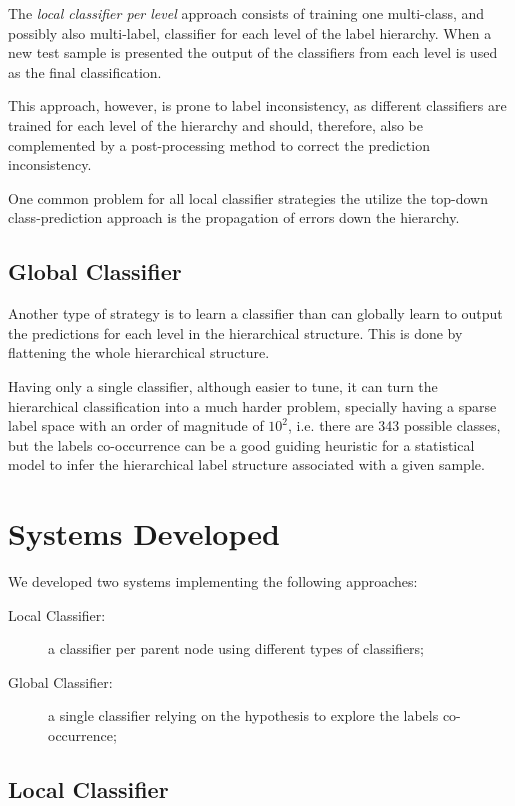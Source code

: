 \documentclass[11pt,a4paper]{article}
\begin{document}
The \textit{local classifier per level} approach consists of training one
multi-class, and possibly also multi-label, classifier for each level of the label
hierarchy. When a new test sample is presented the output of the classifiers
from each level is used as the final classification.

This approach, however, is prone to label inconsistency, as different classifiers
are trained for each level of the hierarchy and should, therefore, also be
complemented by a post-processing method to correct the prediction inconsistency.

One common problem for all local classifier strategies the utilize the top-down
class-prediction approach is the propagation of errors down the hierarchy.



\subsection{Global Classifier}

Another type of strategy is to learn a classifier than can globally learn to
output the predictions for each level in the hierarchical structure. This is
done by flattening the whole hierarchical structure.

Having only a single classifier, although easier to tune, it can turn the
hierarchical classification into a much harder problem, specially having a
sparse label space with an order of magnitude of $10^2$, i.e. there are 343
possible classes,  but the labels co-occurrence can be a good guiding heuristic
for a statistical model to infer the hierarchical label structure associated
with a given sample.

\section{Systems Developed}\label{system}

We developed two systems implementing the following approaches:

\begin{description}
  \item[Local Classifier:] a classifier per parent node using
  different types of classifiers;
  \item[Global Classifier:] a single classifier relying on the hypothesis
  to explore the labels co-occurrence;
\end{description}

\subsection{Local Classifier}
\end{document}
